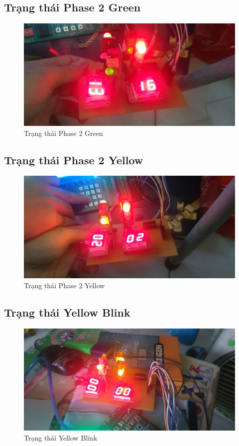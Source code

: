 \documentclass[a4paper]{article}
\begin{document}
\subsection{Trạng thái Phase 2 Green}
\begin{figure}[H]
\begin{center}
\includegraphics[width=12cm]{pic11.jpg}
\caption{Trạng thái Phase 2 Green}
\end{center}
\end{figure}
\subsection{Trạng thái Phase 2 Yellow}
\begin{figure}[H]
\begin{center}
\includegraphics[width=12cm]{pic12.jpg}
\caption{Trạng thái Phase 2 Yellow}
\end{center}
\end{figure}
\subsection{Trạng thái Yellow Blink}
\begin{figure}[H]
\begin{center}
\includegraphics[width=12cm]{pic13.jpg}
\caption{Trạng thái Yellow Blink}
\end{center}
\end{figure}
\end{document}
